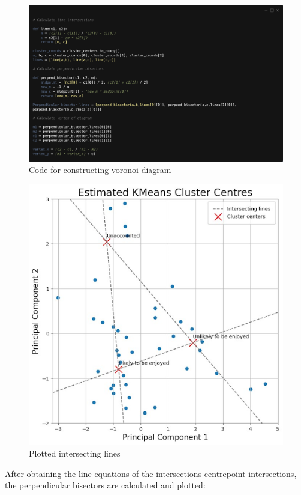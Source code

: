 \documentclass[12pt]{article}
\begin{document}
\begin{figure}[H]
	\includegraphics[width=\textwidth]{code6}
	\centering
	\caption{Code for constructing voronoi diagram}
\end{figure}
\vspace{-1.5em}
\begin{figure}[H]
	\includegraphics[scale=0.3]{10}
	\centering
	\caption{Plotted intersecting lines}
\end{figure}

After obtaining the line equations of the intersections centrepoint intersections, the perpendicular bisectors are calculated and plotted:
\end{document}
